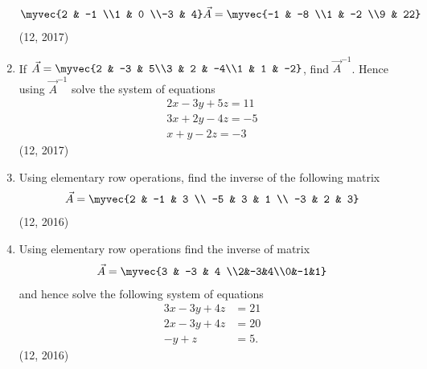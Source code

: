 \begin{enumerate}[label=\thesubsection.\arabic*,ref=\thesubsection.\theenumi]
\begin{align*}
   \myvec{2 & -1 \\1 & 0 \\-3 & 4} \vec{A}=\myvec{-1 & -8 \\1 & -2 \\9 & 22} 
\end{align*} 
\hfill (12, 2017)
 \item If $\vec{A}=\myvec{2 & -3 & 5\\3 & 2 & -4\\1 & 1 & -2}$, find $\vec{A}^{-1}$. Hence using $\vec{A}^{-1}$ solve the system of equations \begin{align*}
    2x-3y+5z=11\\3x+2y-4z=-5\\x+y-2z=-3
\end{align*}
\hfill (12, 2017)
    \item Using elementary row operations, find the inverse of the following matrix 
          \begin{align*}
              \vec{A} = \myvec{2 & -1 & 3  \\
              -5           & 3  & 1  \\
              -3           & 2  & 3}
          \end{align*}
\hfill (12, 2016)
    \item Using elementary row operations find the inverse of matrix
          \begin{align*}
              \vec{A} =\myvec{3 & -3 & 4 \\2&-3&4\\0&-1&1}
          \end{align*}
          and hence solve the following system of equations
          \begin{align*}
              3x-3y+4z & =21 \\
              2x-3y+4z & =20 \\
              -y+z     & =5.
          \end{align*}
\hfill (12, 2016)
\end{enumerate}

